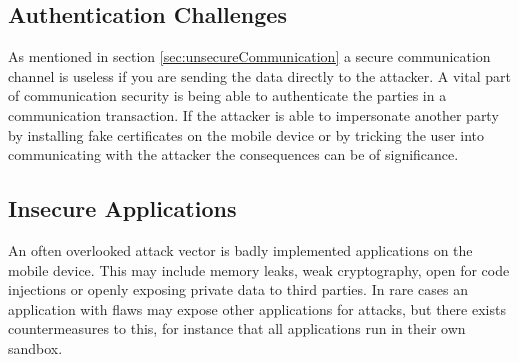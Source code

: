 \subsection{Authentication Challenges}
\label{sec:authenticationChallenges}
As mentioned in section \ref{sec:unsecureCommunication} a secure communication channel is useless if you are sending the data directly to the attacker. A vital part of communication security is being able to authenticate the parties in a communication transaction. If the attacker is able to impersonate another party by installing fake certificates on the mobile device or by tricking the user into communicating with the attacker the consequences can be of significance.

\subsection{Insecure Applications}
An often overlooked attack vector is badly implemented applications on the mobile device. This may include memory leaks, weak cryptography, open for code injections or openly exposing private data to third parties. In rare cases an application with flaws may expose other applications for attacks, but there exists countermeasures to this, for instance that all applications run in their own sandbox.
